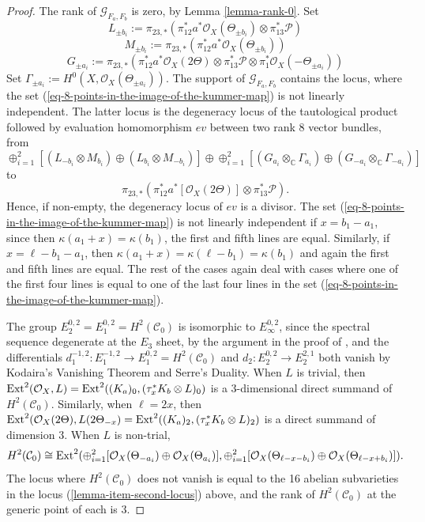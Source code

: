 \documentclass[12pt]{amsart}
\numberwithin{equation}{subsection}
\theoremstyle{plain}
\theoremstyle{definition}
\newcommand{\C}{{\mathcal C}}
\newcommand{\CC}{{\mathbb C}}
\newcommand{\G}{{\mathcal G}}
\renewcommand{\P}{{\mathcal P}}
\newcommand{\StructureSheaf}[1]{{\mathcal O}_{#1}}
\newcommand{\Ext}{{\rm Ext}}
\begin{document}
{\begin{proof}
The rank of $\G_{F_a,F_b}$ is zero, by Lemma \ref{lemma-rank-0}.
Set 
\[
L_{\pm b_i}:=\pi_{23,*}\left(
 \pi_{12}^*a^*\StructureSheaf{X}(\Theta_{\pm b_i})
\otimes\pi_{13}^*\P
\right)
\]
\[
M_{\pm b_i}:=\pi_{23,*}\left(
 \pi_{12}^*a^*\StructureSheaf{X}(\Theta_{\pm b_i})
\right)
\]
\[
G_{\pm a_i}:=\pi_{23,*}\left(
 \pi_{12}^*a^*\StructureSheaf{X}(2\Theta)\otimes\pi_{13}^*\P \otimes \pi_1^*\StructureSheaf{X}(-\Theta_{\pm a_i})
 \right)
\]
Set $\Gamma_{\pm a_i}:=H^0(X,\StructureSheaf{X}(\Theta_{\pm a_i}))$.
The support of $\G_{F_a,F_b}$ contains the locus, where the set (\ref{eq-8-points-in-the-image-of-the-kummer-map}) is not linearly independent. The latter locus is the degeneracy locus of the tautological product followed by  evaluation homomorphism
$ev$ between two rank $8$ vector bundles, from 
\[
\oplus_{i=1}^2[(L_{-b_i}\otimes M_{b_i})\oplus (L_{b_i}\otimes M_{-b_i})]
\oplus
\oplus_{i=1}^2 [(G_{a_i}\otimes_\CC  \Gamma_{a_i})\oplus (G_{-a_i}\otimes_\CC  \Gamma_{-a_i})]
\]
to
\[
\pi_{23,*}\left(
 \pi_{12}^*a^*[\StructureSheaf{X}(2\Theta)]\otimes\pi_{13}^*\P
\right).
\]
Hence, if non-empty, the degeneracy locus of $ev$ is a divisor.
The set (\ref{eq-8-points-in-the-image-of-the-kummer-map}) is not linearly independent 
if $x=b_1-a_1$, since then $\kappa(a_1+x)=\kappa(b_1)$, the first and fifth lines are equal. 
Similarly, if $x=\ell-b_1-a_1$, then $\kappa(a_1+x)=\kappa(\ell-b_1)=\kappa(b_1)$ and again the first and fifth lines are equal. The rest of the cases again deal with cases where one of the first four lines is equal to one of the last four lines in the set (\ref{eq-8-points-in-the-image-of-the-kummer-map}).

The group $E_2^{0,2}=E_1^{0,2}=H^2(\C_0)$ is isomorphic to $E_\infty^{0,2}$, since the spectral sequence degenerate at the $E_3$ sheet, by the argument in the proof of \cite[Sec. 5.1]{gulbrandsen}, and the differentials 
$d_1^{-1,2}:E_1^{-1,2}\rightarrow E_1^{0,2}=H^2(\C_0)$ and
$d_2:E_2^{0,2}\rightarrow E_2^{2,1}$ both vanish by Kodaira's Vanishing Theorem and Serre's Duality.
When $L$ is trivial, then $\Ext^2(\StructureSheaf{X},L)=\Ext^2((K_a)_0,(\tau_x^*K_b\otimes L)_0)$ is a $3$-dimensional direct summand of $H^2(\C_0)$. Similarly, when $\ell=2x$,
then  $\Ext^2(\StructureSheaf{X}(2\Theta),L(2\Theta_{-x})=\Ext^2((K_a)_2,(\tau_x^*K_b\otimes L)_2)$ is a direct summand of dimension $3$. 
When $L$ is non-trial, 
\[
H^2(\C_0)\cong\Ext^2(\oplus_{i=1}^2[\StructureSheaf{X}(\Theta_{-a_i})\oplus \StructureSheaf{X}(\Theta_{a_i})],
\oplus_{i=1}^2[\StructureSheaf{X}(\Theta_{\ell-x-b_i})\oplus \StructureSheaf{X}(\Theta_{\ell-x+b_i})]).\]
The locus where $H^2(\C_0)$ does not vanish is equal to the 16 abelian subvarieties in the locus (\ref{lemma-item-second-locus}) above, and the rank of $H^2(\C_0)$ at the generic point of each is $3$.
\end{proof}

}
\end{document}
